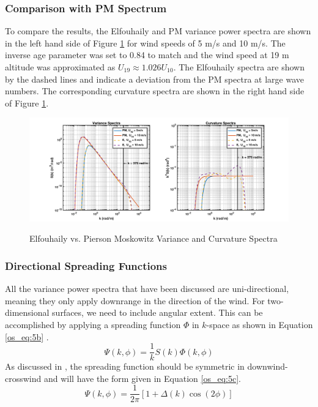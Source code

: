 \subsubsection{Comparison with PM Spectrum}
To compare the results, the Elfouhaily and PM variance power spectra are shown in the left hand side of Figure \ref{os_fig:2} for wind speeds of 5 m/s and 10 m/s. The inverse age parameter was set to 0.84 to match and the wind speed at 19 m altitude was approximated as $U_{19} \approx 1.026 U_{10}$. The Elfouhaily spectra are shown by the dashed lines and indicate a deviation from the PM spectra at large wave numbers. The corresponding curvature spectra are shown in the right hand side of Figure \ref{os_fig:2}. 
\begin{figure}[H]
  \begin{center}
\includegraphics[width=6in]{../media/Ocean_Surface/elf_vs_PM_variance_curvature_spectrum.png}
  \end{center}
  \renewcommand{\baselinestretch}{1} \small\normalsize
  \begin{quote}
    \caption[Elfouhaily vs. Pierson Moskowitz Variance and Curvature Spectra]{Elfouhaily vs. Pierson Moskowitz Variance and Curvature Spectra\label{os_fig:2}}
  \end{quote}
\end{figure}
\renewcommand{\baselinestretch}{2} \small\normalsize

\subsubsection{Directional Spreading Functions}
All the variance power spectra that have been discussed are uni-directional, meaning they only apply downrange in the direction of the wind. For two-dimensional surfaces, we need to include angular extent. This can be accomplished by applying a spreading function $\Phi$ in $k$-space as shown in Equation \ref{os_eq:5b} \cite{elfouhaily}.
\begin{equation}
\label{os_eq:5b}
\Psi(k,\phi) = \frac{1}{k}S(k)\Phi(k,\phi)
\end{equation}
\renewcommand{\baselinestretch}{2} \small\normalsize
As discussed in \cite{elfouhaily}, the spreading function should be symmetric in downwind-crosswind and will have the form given in Equation \ref{os_eq:5c}.
\begin{equation}
\label{os_eq:5c}
\Psi(k,\phi) = \frac{1}{2\pi}\left[1 + \Delta(k)\cos(2\phi) \right]
\end{equation}
\renewcommand{\baselinestretch}{2} \small\normalsize

